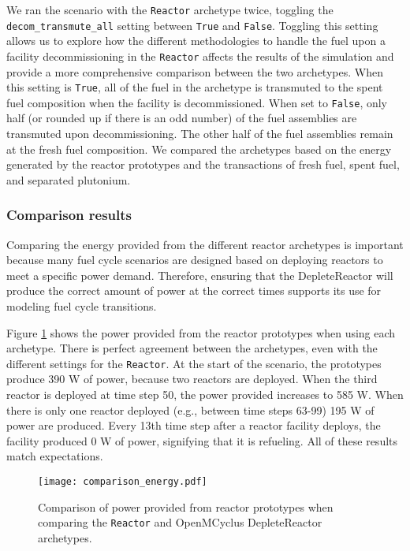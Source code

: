 We ran the scenario with the \Cycamore \texttt{Reactor} archetype twice, 
toggling the \texttt{decom\_transmute\_all} setting between \texttt{True}
and \texttt{False}. Toggling this setting allows us to explore how the 
different methodologies to handle the fuel upon a facility 
decommissioning in the \Cycamore \texttt{Reactor} affects the results of 
the simulation and provide a more comprehensive comparison between the 
two archetypes. When this setting is \texttt{True}, all of the 
fuel in the archetype is transmuted to the spent fuel composition 
when the facility is decommissioned. When set to \texttt{False}, 
only half (or rounded up if there is an odd number) of the fuel 
assemblies are transmuted upon decommissioning. The other half 
of the fuel assemblies remain at the fresh fuel composition. 
We compared the archetypes based on the energy generated 
by the reactor prototypes and the transactions of fresh fuel, spent fuel, 
and separated plutonium. 

\subsubsection{Comparison results}
Comparing the energy provided from the different reactor archetypes is 
important because many 
fuel cycle scenarios are designed based on deploying reactors to meet a 
specific power demand. Therefore, ensuring that the DepleteReactor 
will produce the correct amount of power at the correct times 
supports its use for modeling fuel cycle transitions. 

Figure \ref{fig:comparison_power} shows the power provided from the
reactor prototypes when using each archetype.
There is perfect agreement between the archetypes, even with the different 
settings for the \Cycamore \texttt{Reactor}. At the start of the scenario, 
the prototypes produce 390 W of power, because two reactors are 
deployed. When the third reactor is deployed at time step 50, 
the power provided increases to 585 W. When there is only one  
reactor deployed (e.g., between time steps 63-99) 195 W of power 
are produced. Every 13th time step after a reactor facility deploys, 
the facility produced 0 W of power, signifying that it is refueling.
All of these results match expectations. 

\begin{figure}[ht]
    \centering 
    \texttt{[image: comparison\_energy.pdf]}
    \caption{Comparison of power provided from reactor prototypes 
    when comparing the \Cycamore \texttt{Reactor} and OpenMCyclus 
    DepleteReactor archetypes.}
    \label{fig:comparison_power}
\end{figure}

